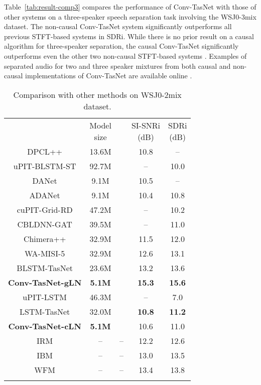 \documentclass[journal]{IEEEtran}
\def\thline{\noalign{\hrule height 1.0pt}}
\begin{document}
Table~\ref{tab:result-comp3} compares the performance of Conv-TasNet with those of other systems on a three-speaker speech separation task involving the WSJ0-3mix dataset. The non-causal Conv-TasNet system significantly outperforms all previous STFT-based systems in SDRi. While there is no prior result on a causal algorithm for three-speaker separation, the causal Conv-TasNet significantly outperforms even the other two non-causal STFT-based systems \cite{isik2016single, kolbaek2017multitalker}. Examples of separated audio for two and three speaker mixtures from both causal and non-causal implementations of Conv-TasNet are available online \cite{web2018tasnet}. 

\begin{table}[!htbp]
	\small
	\centering
	\caption{Comparison with other methods on WSJ0-2mix dataset.}
	\vspace{0.2cm}
	\label{tab:result-comp2}
	\begin{tabular}{c|c|c|c|c}
		\thline
		\thead{Method} & \thead{Model \\ size} & \thead{Causal} & \thead{SI-SNRi\\ (dB)} & \thead{SDRi\\ (dB)} \\
		\thline
		DPCL++ \cite{isik2016single} & 13.6M & \texttimes & 10.8 & -- \\
		uPIT-BLSTM-ST \cite{kolbaek2017multitalker} & 92.7M & \texttimes  & -- & 10.0 \\
		DANet \cite{chen2017deep} & 9.1M & \texttimes & 10.5 & --  \\
		ADANet \cite{luo2017speaker} & 9.1M & \texttimes & 10.4 & 10.8 \\
		cuPIT-Grid-RD \cite{xu2018single} & 47.2M & \texttimes & -- & 10.2 \\
		CBLDNN-GAT\cite{li2018cbldnn} & 39.5M & \texttimes & -- & 11.0 \\
		Chimera++ \cite{wang2018alternative} & 32.9M & \texttimes & 11.5 & 12.0 \\
		WA-MISI-5 \cite{wang2018end} & 32.9M & \texttimes & 12.6 & 13.1 \\
		BLSTM-TasNet \cite{luo2018real} & 23.6M & \texttimes & 13.2 & 13.6 \\
		\bf{Conv-TasNet-gLN} & \bf{5.1M} & \texttimes  & \bf{15.3} & \bf{15.6} \\
		\hline
		uPIT-LSTM \cite{kolbaek2017multitalker} & 46.3M & \checkmark  & -- & 7.0 \\
		LSTM-TasNet \cite{luo2018real} & 32.0M & \checkmark & \bf{10.8} & \bf{11.2} \\
		\bf{Conv-TasNet-cLN} & \bf{5.1M} & \checkmark & 10.6 & 11.0 \\
		\thline	
		IRM & -- &  --  & 12.2 & 12.6 \\
		IBM & -- &  --  & 13.0 & 13.5 \\
		WFM & -- &  --  & 13.4 & 13.8 \\
		\thline
	\end{tabular}
\end{table}
\end{document}
